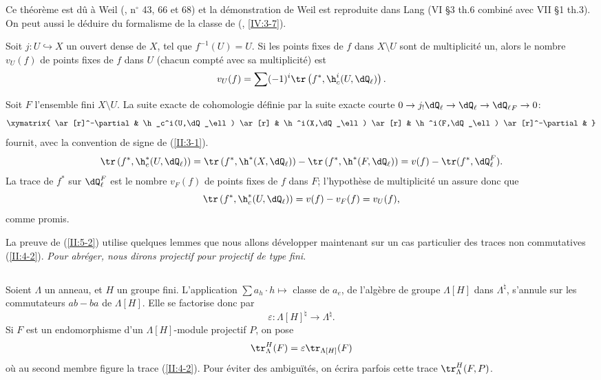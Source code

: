 Ce théorème est dû à Weil (\cite{we48}, n$^\circ$ 43, 66 et 68) et la 
démonstration de Weil est reproduite dans Lang \cite{la83} (VI \S3 th.6 combiné 
avec VII \S1 th.3). On peut aussi le déduire du formalisme de la classe de 
 (, \ref{IV:3-7}). 





\begin{corollary_}\label{II:5-4}
Soit $j:U\hookrightarrow X$ un ouvert dense de $X$, tel que $f^{-1}(U)=U$. Si 
les points fixes de $f$ dans $X\setminus U$ sont de multiplicité un, alors le 
nombre $v_U(f)$ de points fixes de $f$ dans $U$ (chacun compté avec sa 
multiplicité) est 
\[
  v_U(f) = \sum (-1)^i \tr\left(f^*,\h_c^i(U,\dQ_\ell)\right) \text{.}
\]
\end{corollary_}

Soit $F$ l'ensemble fini $X\setminus U$. La suite exacte de cohomologie 
définie par la suite exacte courte 
$0\to j_! \dQ_\ell\to\dQ_\ell\to{\dQ_\ell}_F\to 0$: 
\[\xymatrix{
  \ar[r]^-\partial 
    & \h_c^i(U,\dQ_\ell) \ar[r] 
    & \h^i(X,\dQ_\ell) \ar[r] 
    & \h^i(F,\dQ_\ell) \ar[r]^-\partial 
    & 
}\]
fournit, avec la convention de signe de (\ref{II:3-1}). 
\[
  \tr\left(f^*,\h_c^*(U,\dQ_\ell)\right) 
    = \tr\left(f^*,\h^*(X,\dQ_\ell)\right) - \tr\left(f^*,\h^*(F,\dQ_\ell)\right) 
    = v(f) - \tr(f^*,\dQ_\ell^F) \text{.}
\]
La trace de $f^*$ sur $\dQ_\ell^F$ est le nombre $v_F(f)$ de points fixes de 
$f$ dans $F$; l'hypothèse de multiplicité un assure donc que 
\[
  \tr\left(f^*,\h_c^*(U,\dQ_\ell)\right) 
    = v(f) - v_F(f) = v_U(f) \text{,}
\]
comme promis. 

La preuve de (\ref{II:5-2}) utilise quelques lemmes que nous allons 
développer maintenant sur un cas particulier des traces non commutatives 
(\ref{II:4-2}). \emph{Pour abréger, nous dirons projectif pour projectif de 
type fini}. 





\subsection{}\label{II:5-5}

Soient $\Lambda$ un anneau, et $H$ un groupe fini. L'application 
$\sum a_h \cdot h\mapsto $ classe de $a_e$, de l'algèbre de groupe 
$\Lambda[H]$ dans $\Lambda^\natural$, s'annule sur les commutateurs $ab-ba$ de 
$\Lambda[H]$. Elle se factorise donc par 
\[
  \varepsilon : \Lambda[H]^\natural \to \Lambda^\natural \text{.}
\]
Si $F$ est un endomorphisme d'un $\Lambda[H]$-module projectif $P$, on pose 
\[
  \tr_\Lambda^H(F) = \varepsilon \tr_{\Lambda[H]} (F) 
\]
où au second membre figure la trace (\ref{II:4-2}). Pour éviter des 
ambiguïtés, on écrira parfois cette trace $\tr_\Lambda^H(F,P)$. 





